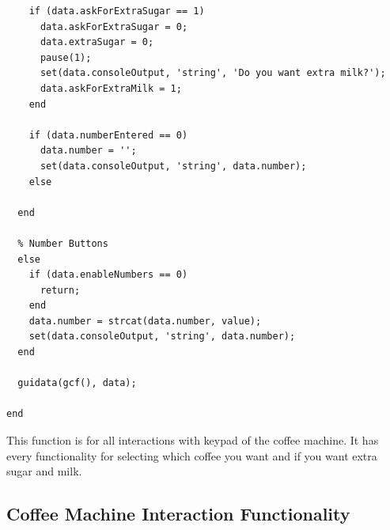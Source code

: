 \documentclass[a4paper, 10pt]{article}
\begin{document}
\begin{lstlisting}
    if (data.askForExtraSugar == 1)
      data.askForExtraSugar = 0;
      data.extraSugar = 0;
      pause(1);
      set(data.consoleOutput, 'string', 'Do you want extra milk?');
      data.askForExtraMilk = 1;
    end

    if (data.numberEntered == 0)
      data.number = '';
      set(data.consoleOutput, 'string', data.number);
    else

  end

  % Number Buttons
  else
    if (data.enableNumbers == 0)
      return;
    end
    data.number = strcat(data.number, value);
    set(data.consoleOutput, 'string', data.number);
  end

  guidata(gcf(), data);

end
			\end{lstlisting}
			\noindent This function is for all interactions with keypad of the coffee machine. It has every functionality for selecting which coffee you want and if you want extra sugar and milk. 
		\subsection{Coffee Machine Interaction Functionality}
\end{document}
